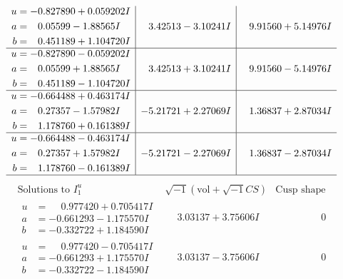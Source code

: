 \documentclass[1p]{elsarticle_modified}
\theoremstyle{definition}
\newcommand{\I}{\sqrt{-1}}
\begin{document}
$$\begin{array}{c|c|c}
\begin{aligned}
u &= -0.827890 + 0.059202 I \\
a &= \phantom{-}0.05599 - 1.88565 I \\
b &= \phantom{-}0.451189 + 1.104720 I\end{aligned}
 & \phantom{-}3.42513 - 3.10241 I & \phantom{-}9.91560 + 5.14976 I \\ \hline\begin{aligned}
u &= -0.827890 - 0.059202 I \\
a &= \phantom{-}0.05599 + 1.88565 I \\
b &= \phantom{-}0.451189 - 1.104720 I\end{aligned}
 & \phantom{-}3.42513 + 3.10241 I & \phantom{-}9.91560 - 5.14976 I \\ \hline\begin{aligned}
u &= -0.664488 + 0.463174 I \\
a &= \phantom{-}0.27357 - 1.57982 I \\
b &= \phantom{-}1.178760 + 0.161389 I\end{aligned}
 & -5.21721 + 2.27069 I & \phantom{-}1.36837 + 2.87034 I \\ \hline\begin{aligned}
u &= -0.664488 - 0.463174 I \\
a &= \phantom{-}0.27357 + 1.57982 I \\
b &= \phantom{-}1.178760 - 0.161389 I\end{aligned}
 & -5.21721 - 2.27069 I & \phantom{-}1.36837 - 2.87034 I\\
 \hline 
 \end{array}$$\newpage$$\begin{array}{c|c|c}  
\text{Solutions to }I^u_{1}& \I (\text{vol} + \sqrt{-1}CS) & \text{Cusp shape}\\
 \hline 
\begin{aligned}
u &= \phantom{-}0.977420 + 0.705417 I \\
a &= -0.661293 - 1.175570 I \\
b &= -0.332722 + 1.184590 I\end{aligned}
 & \phantom{-}3.03137 + 3.75606 I & \phantom{-0.000000 } 0 \\ \hline\begin{aligned}
u &= \phantom{-}0.977420 - 0.705417 I \\
a &= -0.661293 + 1.175570 I \\
b &= -0.332722 - 1.184590 I\end{aligned}
 & \phantom{-}3.03137 - 3.75606 I & \phantom{-0.000000 } 0 \\ \hline\begin{aligned}

\end{aligned}
\end{array}$$
\end{document}
